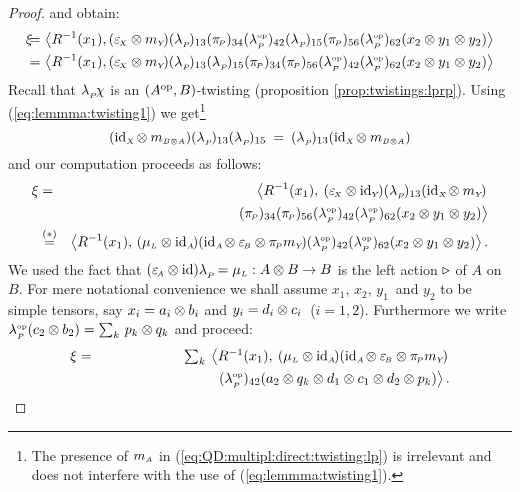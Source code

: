 \begin{proof}
and obtain:
\begin{eqnarray*}
\xi &\!\!\!=\!\!\!&\!
      \left\langle R^{-1}(x_1),
      (\epsX \tens  \mult{Y}\!) (\lp)_{13}  (\piP)_{34}  (\lpop)_{42}  (\lp)_{15}
      (\piP)_{56}  (\lpop)_{62} (x_2 \tens y_1 \tens y_2)\right \rangle
\\&\!\!\!=\!\!\!&\!
      \left\langle R^{-1}(x_1),
      (\epsX \tens  \mult{Y}\!) (\lp)_{13} (\lp)_{15}
      (\piP)_{34}  (\piP)_{56}  (\lpop)_{42}
      (\lpop)_{62} (x_2 \tens y_1 \tens y_2)\right \rangle
\end{eqnarray*}
Recall that $\lambda_{_P\!}\chi$ is an\/ $(A^{\rm op},B)$-twisting (proposition \ref{prop:twistings:lprp}).
Using (\ref{eq:lemmma:twisting1})
we get\footnote{The presence of $m_{\scriptscriptstyle A}$ in (\ref{eq:QD:multipl:direct:twisting:lp})
is irrelevant and does not interfere with the use of (\ref{eq:lemmma:twisting1}).}
\begin{equation}\label{eq:QD:multipl:direct:twisting:lp}
    (\mbox{\rm id}_{\scriptscriptstyle X\!} \otimes  m_{\scriptscriptstyle B \otimes A}) (\lambda_{_P\!})_{13}  (\lambda_{_P\!})_{15}
          \:=\:  (\lambda_{_P\!})_{13} (\mbox{\rm id}_{\scriptscriptstyle X\!} \otimes  m_{\scriptscriptstyle B \otimes A})
\end{equation}
and our computation proceeds as follows:
\begin{eqnarray*}
\xi &=& \left\langle R^{-1}(x_1),\:
      (\epsX \tens \idY) (\lp)_{13} (\idX \tens  \mult{Y}\!) \right.
\\&& \hspace{7em}\left.
       (\piP)_{34}   (\piP)_{56}  (\lpop)_{42}
      (\lpop)_{62} (x_2 \tens y_1 \tens y_2)\right \rangle
\\&\stackrel{(*)}{=}&
\pairM{R^{-1}(x_1)}{(\muL\tens \idA)(\idA \tens \epsB \tens  \piP \mult{Y}\!)
          (\lpop)_{42}  (\lpop)_{62} (x_2 \tens y_1 \tens y_2)}.
\end{eqnarray*}
We used the fact that $(\varepsilon_{\scriptscriptstyle \! A} \otimes \mbox{\rm id})\lambda_{_P\!} = \mu_{\scriptscriptstyle L} : A \otimes B \rightarrow B$
is the left action $\triangleright$ of $A$ on $B$.
For mere notational convenience we shall assume \mbox{$x_1,\, x_2,\, y_1$}\ and $y_2$
to be simple tensors, say $x_i = a_i\otimes b_i$ and $y_i = d_i\otimes c_i\,$ ($i=1,2$).
Furthermore we write $\lambda^{\scriptscriptstyle \rm op}_{_P\!}(c_2 \otimes b_2) = \sum_k \, p_{k} \otimes q_{k}$
and proceed:
\begin{eqnarray*}
\xi &=& \textstyle \sum_k \:
\left\langle R^{-1}(x_1),\:
(\mu_{\scriptscriptstyle L}\otimes \mbox{\rm id}_{\scriptscriptstyle A\!})(\mbox{\rm id}_{\scriptscriptstyle A\!} \otimes \varepsilon_{\scriptscriptstyle \! B} \otimes  \pi_{\scriptscriptstyle \! P} m_{\scriptscriptstyle Y}\!) \right.
\\&& \hspace{8em}\left.
          (\lambda^{\scriptscriptstyle \rm op}_{_P\!})_{42} (a_2 \otimes q_k \otimes d_1 \otimes c_1 \otimes d_2 \otimes p_k)\right  \rangle.
\end{eqnarray*}

\end{proof}
